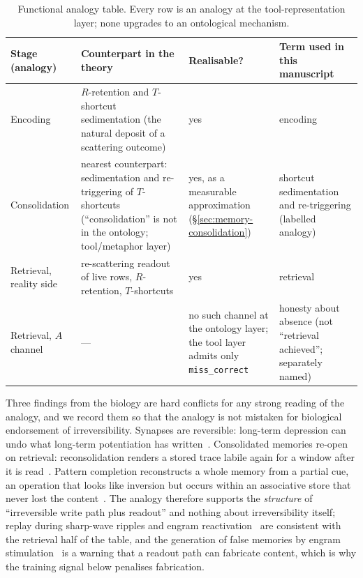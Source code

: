 \documentclass[11pt,a4paper]{article}
\newcommand{\thm}[1]{\nolinkurl{#1}}
\begin{document}
\begin{table}[htbp]
\centering
\small
\caption{Functional analogy table. Every row is an analogy at the tool-representation layer; none upgrades to an ontological mechanism.}
\label{tab:analogy}
\begin{tabular}{@{}p{2.3cm}p{5.2cm}p{2.2cm}p{4.2cm}@{}}
\toprule
Stage (analogy) & Counterpart in the theory & Realisable? & Term used in this manuscript \\
\midrule
Encoding & $R$-retention and $T$-shortcut sedimentation (the natural deposit of a scattering outcome) & yes & encoding \\
Consolidation & nearest counterpart: sedimentation and re-triggering of $T$-shortcuts (``consolidation'' is not in the ontology; tool/metaphor layer) & yes, as a measurable approximation (\S\ref{sec:memory-consolidation}) & shortcut sedimentation and re-triggering (labelled analogy) \\
Retrieval, reality side & re-scattering readout of live rows, $R$-retention, $T$-shortcuts & yes & retrieval \\
Retrieval, $A$ channel & --- & no such channel at the ontology layer; the tool layer admits only \thm{miss_correct} & honesty about absence (not ``retrieval achieved''; separately named) \\
\bottomrule
\end{tabular}
\end{table}

Three findings from the biology are hard conflicts for any strong reading of the analogy, and we record them so that the analogy is not mistaken for biological endorsement of irreversibility. Synapses are reversible: long-term depression can undo what long-term potentiation has written~\cite{bliss1973,dudek1992,abraham1996}. Consolidated memories re-open on retrieval: reconsolidation renders a stored trace labile again for a window after it is read~\cite{nader2000}. Pattern completion reconstructs a whole memory from a partial cue, an operation that looks like inversion but occurs within an associative store that never lost the content~\cite{nakazawa2002,neunuebel2014}. The analogy therefore supports the \emph{structure} of ``irreversible write path plus readout'' and nothing about irreversibility itself; replay during sharp-wave ripples and engram reactivation~\cite{buzsaki2015,liu2012,josselyn2020} are consistent with the retrieval half of the table, and the generation of false memories by engram stimulation~\cite{ramirez2013} is a warning that a readout path can fabricate content, which is why the training signal below penalises fabrication.
\end{document}
